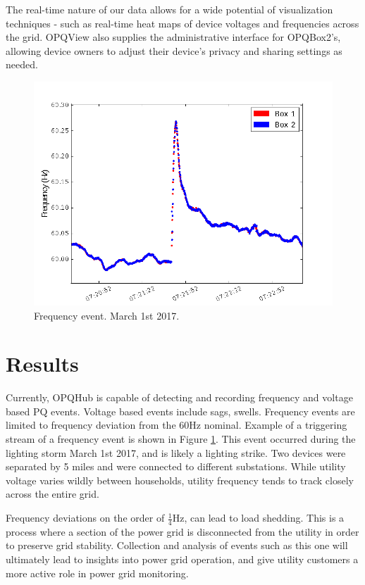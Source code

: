 \documentclass[a4paper, conference]{IEEEtran}
\begin{document}
The real-time nature of our data allows for a wide potential of visualization techniques - such as real-time heat maps of device voltages and frequencies across the grid. OPQView also supplies the administrative interface for OPQBox2's, allowing device owners to adjust their device's privacy and sharing settings as needed. 

\begin{figure}[h]
    \centering
    \includegraphics[width=0.9\columnwidth]{img/Event1_f.png}
    \caption{Frequency event. March 1st 2017.}
    \label{fig:event}
\end{figure}

\section{Results}

Currently, OPQHub is capable of detecting and recording frequency and 
voltage based PQ events. Voltage based events include sags, swells.
Frequency events are limited to frequency deviation from the 60Hz nominal. Example of a triggering stream of a frequency event is shown in Figure \ref{fig:event}. This event occurred during the lighting storm March 1st 2017, and is likely a lighting strike. Two devices were separated by 5 miles and were connected to different substations. 
While utility voltage varies wildly between households, utility frequency tends to track closely across the entire grid. 

Frequency deviations on the order of $\frac{1}{4}$Hz, can lead to load shedding\cite{GE_LS}. This is a process where a section of the power grid is disconnected from the utility in order to preserve grid stability. Collection and analysis of events such as this one will ultimately lead to insights into power grid operation, and give utility customers a more active role in power grid monitoring.
\end{document}
